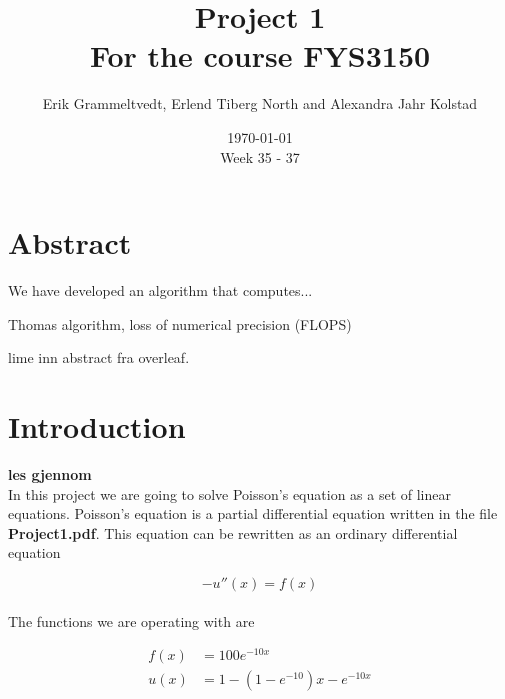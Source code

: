 \documentclass{article}
\begin{document}
\addtocounter{page}{0}

\title{Project 1 \\
      \large For the course FYS3150}
\date{\today \\
    \vspace{1mm}
    \large Week 35 - 37}

\author{Erik Grammeltvedt, Erlend Tiberg North and Alexandra Jahr Kolstad}

\maketitle

\vspace{1cm}

\tableofcontents



\section{Abstract}

We have developed an algorithm that computes...

Thomas algorithm, loss of numerical precision (FLOPS)

{\large lime inn abstract fra overleaf.}


\vspace{1cm}

\section{Introduction}

{\large \bf les gjennom} \\

In this project we are going to solve Poisson's equation as a set of linear equations. Poisson's equation is a partial differential equation written in the file \textbf{Project1.pdf}. This equation can be rewritten as an ordinary differential equation

\begin{equation}
  - u''(x) = f(x)   \label{eq:u(x)diffeq}
\end{equation} \\

The functions we are operating with are

\begin{align}
  f(x) &= 100 e ^{-10 x}    \label{eq:f(x)eq} \\
  u(x) &= 1 - (1- e ^{-10}) x - e ^{- 10 x} \label{eq:u(x)eq}
\end{align} \\
\end{document}
